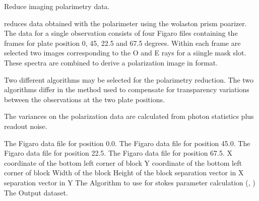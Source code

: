 \begin{manroutinedescription}
        Reduce {} imaging polarimetry data.

        {} reduces data obtained with the {} {} polarimeter
        using the wolaston  prism poarizer. The data for a
        single observation consists of four Figaro files containing the
        frames for plate position 0, 45, 22.5 and 67.5 degrees. Within each
        frame are selected two images corresponding to the O and E rays for
        a siingle mask slot. These spectra are combined
        to derive a polarization image in {} format.

        Two different algorithms may be selected for the polarimetry
        reduction. The two algorithms differ in the method used to
        compensate for transparency variations between the observations
        at the two plate positions.

        The variances on the polarization data are calculated from photon
        statistics plus readout noise.

\begin{manparametertable}
     The Figaro data file for %
position 0.0.
     The Figaro data file for %
position 45.0.
     The Figaro data file for %
position 22.5.
     The Figaro data file for %
position 67.5.
  X coordinate of the bottom left %
corner of block
  Y coordinate of the bottom left %
corner of block
  Width of the block
  Height of the block
  {} separation vector %
in X
  {} separation vector %
in Y
     The Algorithm to use for %
stokes
                               parameter calculation ({}, {})
  The %
Output dataset.

\end{manparametertable}
\end{manroutinedescription}
